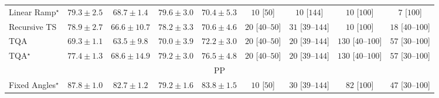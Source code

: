 \begin{tabular}{l|cccc|cccc|}
Linear Ramp$^\star$ & {\cellcolor[HTML]{CB4B02}} \color[HTML]{F1F1F1} $79.3\pm 2.5$ & {\cellcolor[HTML]{FEA937}} \color[HTML]{000000} $68.7\pm 1.4$ & {\cellcolor[HTML]{C84A02}} \color[HTML]{F1F1F1} $79.6\pm 3.0$ & {\cellcolor[HTML]{FE9829}} \color[HTML]{000000} $70.4\pm 5.3$ & {\cellcolor[HTML]{FFF7F3}} \color[HTML]{000000} $10$ [$50$] & {\cellcolor[HTML]{FFF7F3}} \color[HTML]{000000} $10$ [$144$] & {\cellcolor[HTML]{FFF7F3}} \color[HTML]{000000} $10$ [$100$] & {\cellcolor[HTML]{FFF7F3}} \color[HTML]{000000} $7$ [$100$] \\
Recursive TS & {\cellcolor[HTML]{CE4F03}} \color[HTML]{F1F1F1} $78.9\pm 2.7$ & {\cellcolor[HTML]{FEBD49}} \color[HTML]{000000} $66.6\pm 10.7$ & {\cellcolor[HTML]{D35406}} \color[HTML]{F1F1F1} $78.2\pm 3.3$ & {\cellcolor[HTML]{FD9627}} \color[HTML]{000000} $70.6\pm 4.6$ & {\cellcolor[HTML]{FFF4F0}} \color[HTML]{000000} $20$ [$40$--$50$] & {\cellcolor[HTML]{FFF2EE}} \color[HTML]{000000} $31$ [$39$--$144$] & {\cellcolor[HTML]{FFF7F3}} \color[HTML]{000000} $10$ [$100$] & {\cellcolor[HTML]{FFF5F1}} \color[HTML]{000000} $18$ [$40$--$100$] \\
TQA & {\cellcolor[HTML]{FEA332}} \color[HTML]{000000} $69.3\pm 1.1$ & {\cellcolor[HTML]{FED471}} \color[HTML]{000000} $63.5\pm 9.8$ & {\cellcolor[HTML]{FE9C2C}} \color[HTML]{000000} $70.0\pm 3.9$ & {\cellcolor[HTML]{F68820}} \color[HTML]{F1F1F1} $72.2\pm 3.0$ & {\cellcolor[HTML]{FFF4F0}} \color[HTML]{000000} $20$ [$40$--$50$] & {\cellcolor[HTML]{FFF4F0}} \color[HTML]{000000} $20$ [$39$--$144$] & {\cellcolor[HTML]{FDDBD7}} \color[HTML]{000000} $130$ [$40$--$100$] & {\cellcolor[HTML]{FEECE9}} \color[HTML]{000000} $57$ [$30$--$100$] \\
TQA$^\star$ & {\cellcolor[HTML]{D85A09}} \color[HTML]{F1F1F1} $77.4\pm 1.3$ & {\cellcolor[HTML]{FEAA38}} \color[HTML]{000000} $68.6\pm 14.9$ & {\cellcolor[HTML]{CB4B02}} \color[HTML]{F1F1F1} $79.2\pm 3.0$ & {\cellcolor[HTML]{DF620D}} \color[HTML]{F1F1F1} $76.5\pm 4.8$ & {\cellcolor[HTML]{FFF4F0}} \color[HTML]{000000} $20$ [$40$--$50$] & {\cellcolor[HTML]{FFF4F0}} \color[HTML]{000000} $20$ [$39$--$144$] & {\cellcolor[HTML]{FDDBD7}} \color[HTML]{000000} $130$ [$40$--$100$] & {\cellcolor[HTML]{FEECE9}} \color[HTML]{000000} $57$ [$30$--$100$] \\
\cline{1-9}
\multicolumn{9}{c}{\rule{0pt}{8pt}PP} \\
\midrule
Fixed Angles$^\star$ & {\cellcolor[HTML]{00472A}} \color[HTML]{F1F1F1} $87.8\pm 1.0$ & {\cellcolor[HTML]{076D39}} \color[HTML]{F1F1F1} $82.7\pm 1.2$ & {\cellcolor[HTML]{228343}} \color[HTML]{F1F1F1} $79.2\pm 1.6$ & {\cellcolor[HTML]{006636}} \color[HTML]{F1F1F1} $83.8\pm 1.5$ & {\cellcolor[HTML]{FFF7F3}} \color[HTML]{000000} $10$ [$50$] & {\cellcolor[HTML]{FFF2EE}} \color[HTML]{000000} $30$ [$39$--$144$] & {\cellcolor[HTML]{FEE6E3}} \color[HTML]{000000} $82$ [$100$] & {\cellcolor[HTML]{FEEEEB}} \color[HTML]{000000} $47$ [$30$--$100$] \\

\end{tabular}
